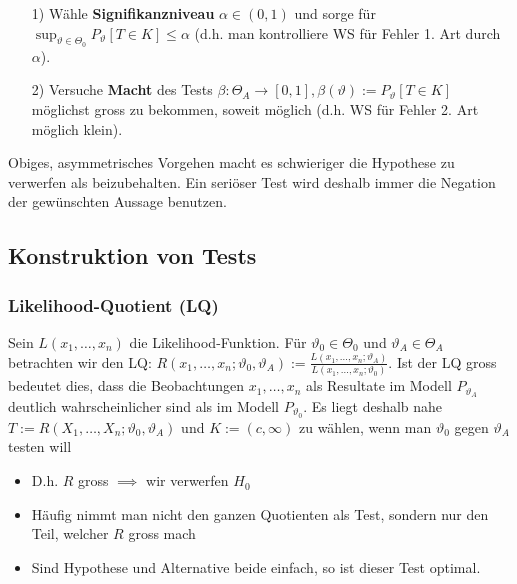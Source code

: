 \begin{itemize}
        \begin{itemize}
            \item[1)] Wähle \textbf{Signifikanzniveau} $\alpha \in (0, 1)$ und sorge für $\sup_{\vartheta \in \Theta_0} P_\vartheta[T \in K] \le \alpha$ (d.h. man kontrolliere WS für Fehler 1. Art durch $\alpha$).
            \item[2)] Versuche \textbf{Macht} des Tests $\beta: \Theta_A \to [0, 1], \beta(\vartheta) := P_\vartheta[T \in K]$ möglichst gross zu bekommen, soweit möglich (d.h. WS für Fehler 2. Art möglich klein).
        \end{itemize}
    Obiges, asymmetrisches Vorgehen macht es schwieriger die Hypothese zu verwerfen als beizubehalten. Ein seriöser Test wird deshalb immer die Negation der gewünschten Aussage benutzen.
\end{itemize}

\subsection{Konstruktion von Tests}
\subsubsection{Likelihood-Quotient (LQ)}
Sein $L(x_1, \dots, x_n)$ die Likelihood-Funktion. Für $\vartheta_0 \in \Theta_0$ und $\vartheta_A \in \Theta_A$ betrachten wir den LQ: $R(x_1, \dots, x_n; \vartheta_0, \vartheta_A) := \frac{L(x_1, \dots, x_n; \vartheta_A)}{L(x_1, \dots, x_n; \vartheta_0)}$. Ist der LQ gross bedeutet dies, dass die Beobachtungen $x_1, \dots, x_n$ als Resultate im Modell $P_{\vartheta_A}$ deutlich wahrscheinlicher sind als im Modell $P_{\vartheta_0}$. Es liegt deshalb nahe $T:= R(X_1, \dots, X_n; \vartheta_0, \vartheta_A)$ und $K := (c, \infty)$ zu wählen, wenn man $\vartheta_0$ gegen $\vartheta_A$ testen will
\begin{itemize}
    \item D.h. $R$ gross $\implies$ wir verwerfen $H_0$
    \item Häufig nimmt man nicht den ganzen Quotienten als Test, sondern nur den Teil, welcher $R$ gross mach
    \item Sind Hypothese und Alternative beide einfach, so ist dieser Test optimal.
\end{itemize}

